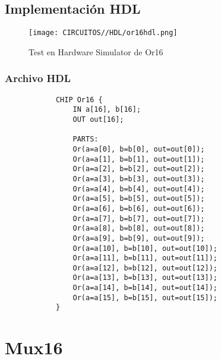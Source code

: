 \documentclass[12pt]{article}
\begin{document}
		\subsection{Implementación HDL}
		\begin{figure}[H]
			\centering
			\texttt{[image: CIRCUITOS//HDL/or16hdl.png]}
			\caption{Test en Hardware Simulator de Or16 \cite{nand2tetris}}
			\label{fig:hdlor16}
		\end{figure}
		\subsubsection{Archivo HDL}
		\begin{lstlisting}
			CHIP Or16 {
				IN a[16], b[16];
				OUT out[16];

				PARTS:
				Or(a=a[0], b=b[0], out=out[0]);
				Or(a=a[1], b=b[1], out=out[1]);
				Or(a=a[2], b=b[2], out=out[2]);
				Or(a=a[3], b=b[3], out=out[3]);
				Or(a=a[4], b=b[4], out=out[4]);
				Or(a=a[5], b=b[5], out=out[5]);
				Or(a=a[6], b=b[6], out=out[6]);
				Or(a=a[7], b=b[7], out=out[7]);
				Or(a=a[8], b=b[8], out=out[8]);
				Or(a=a[9], b=b[9], out=out[9]);
				Or(a=a[10], b=b[10], out=out[10]);
				Or(a=a[11], b=b[11], out=out[11]);
				Or(a=a[12], b=b[12], out=out[12]);
				Or(a=a[13], b=b[13], out=out[13]);
				Or(a=a[14], b=b[14], out=out[14]);
				Or(a=a[15], b=b[15], out=out[15]);
			}
		\end{lstlisting}
		\newpage


		\section{Mux16}
\end{document}
